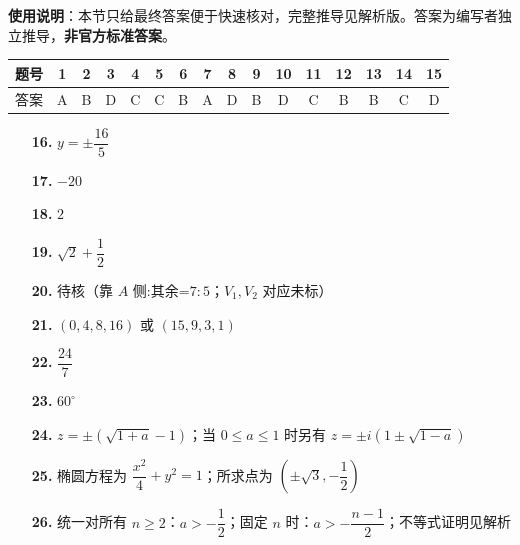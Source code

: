 
\begin{gknotice}
\textbf{使用说明}：本节只给最终答案便于快速核对，完整推导见解析版。答案为编写者独立推导，\textbf{非官方标准答案}。
\end{gknotice}

\begin{center}\begin{tabular}{cccccccccccccccc}
\toprule
题号 & 1 & 2 & 3 & 4 & 5 & 6 & 7 & 8 & 9 & 10 & 11 & 12 & 13 & 14 & 15 \\
\midrule
答案 & A & B & D & C & C & B & A & D & B & D & C & B & B & C & D \\
\bottomrule
\end{tabular}\end{center}

\begin{itemize}[leftmargin=2.6em]
  \item[\textbf{16.}] $y=\pm\dfrac{16}{5}$
  \item[\textbf{17.}] $-20$
  \item[\textbf{18.}] $2$
  \item[\textbf{19.}] $\sqrt2+\dfrac12$
  \item[\textbf{20.}] 待核（靠 $A$ 侧:其余=$7:5$；$V_1,V_2$ 对应未标）
\end{itemize}

\begin{itemize}[leftmargin=2.6em]
  \item[\textbf{21.}] $(0,4,8,16)$ 或 $(15,9,3,1)$
  \item[\textbf{22.}] $\dfrac{24}{7}$
  \item[\textbf{23.}] $60^\circ$
  \item[\textbf{24.}] $z=\pm(\sqrt{1+a}-1)$；当 $0\le a\le1$ 时另有 $z=\pm i(1\pm\sqrt{1-a})$
  \item[\textbf{25.}] 椭圆方程为 $\dfrac{x^2}{4}+y^2=1$；所求点为 $(\pm\sqrt3,-\dfrac12)$
  \item[\textbf{26.}] 统一对所有 $n\ge2$：$a>-\dfrac12$；固定 $n$ 时：$a>-\dfrac{n-1}{2}$；不等式证明见解析
\end{itemize}

